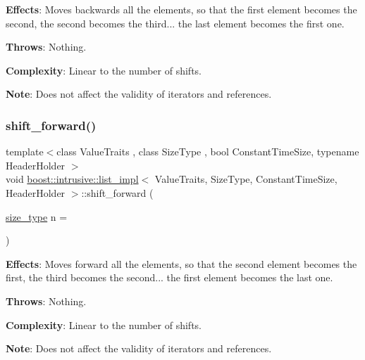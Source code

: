 {\bfseries Effects}\+: Moves backwards all the elements, so that the first element becomes the second, the second becomes the third... the last element becomes the first one.

{\bfseries Throws}\+: Nothing.

{\bfseries Complexity}\+: Linear to the number of shifts.

{\bfseries Note}\+: Does not affect the validity of iterators and references. \mbox{\label{classboost_1_1intrusive_1_1list__impl_ad8e0920e742cf90e983e0cc552b8489e}} 
\subsubsection{\texorpdfstring{shift\+\_\+forward()}{shift\_forward()}}
{\footnotesize\ttfamily template$<$class Value\+Traits , class Size\+Type , bool Constant\+Time\+Size, typename Header\+Holder $>$ \\
void \hyperlink{classboost_1_1intrusive_1_1list__impl}{boost\+::intrusive\+::list\+\_\+impl}$<$ Value\+Traits, Size\+Type, Constant\+Time\+Size, Header\+Holder $>$\+::shift\+\_\+forward (\begin{DoxyParamCaption}\item[{\hyperlink{classboost_1_1intrusive_1_1list__impl_a3e340b93081e392fba09de7145fb5733}{size\+\_\+type}}]{n = {} }\end{DoxyParamCaption})\hspace{0.3cm}{\ttfamily [inline]}}

{\bfseries Effects}\+: Moves forward all the elements, so that the second element becomes the first, the third becomes the second... the first element becomes the last one.

{\bfseries Throws}\+: Nothing.

{\bfseries Complexity}\+: Linear to the number of shifts.

{\bfseries Note}\+: Does not affect the validity of iterators and references. \mbox{\label{classboost_1_1intrusive_1_1list__impl_a9da0074a31566f3a7dbc3cd1a2d752c1}} 
